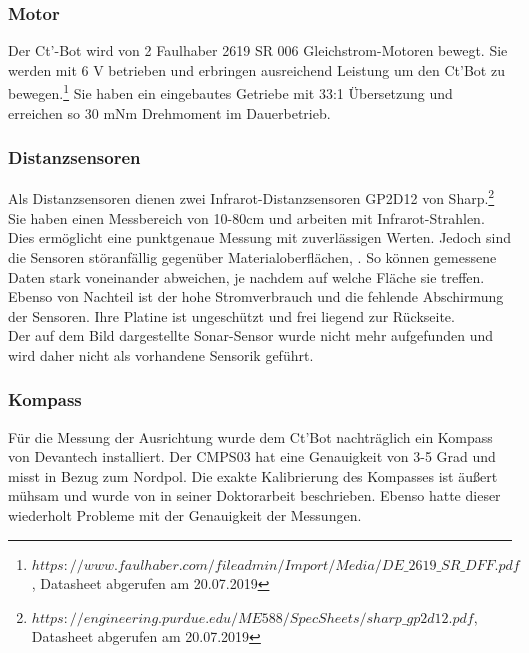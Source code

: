 \documentclass[twoside,11pt, a4paper]{report}
\begin{document}
	\subsubsection{Motor}
	Der Ct'-Bot wird von 2 Faulhaber 2619 SR 006 Gleichstrom-Motoren bewegt. Sie werden mit 6 V betrieben und erbringen ausreichend Leistung um den Ct'Bot zu bewegen.\footnote{$https://www.faulhaber.com/fileadmin/Import/Media/DE\_2619\_SR\_DFF.pdf$, Datasheet abgerufen am 20.07.2019} Sie haben ein eingebautes Getriebe mit 33:1 Übersetzung und erreichen so 30 mNm Drehmoment im Dauerbetrieb. 
	
	\subsubsection{Distanzsensoren}
	Als Distanzsensoren dienen zwei Infrarot-Distanzsensoren GP2D12 von Sharp.\footnote{$https://engineering.purdue.edu/ME588/SpecSheets/sharp\_gp2d12.pdf$, Datasheet abgerufen am 20.07.2019} Sie haben einen Messbereich von 10-80cm und arbeiten mit Infrarot-Strahlen. Dies ermöglicht eine punktgenaue Messung mit zuverlässigen Werten. Jedoch sind die Sensoren störanfällig gegenüber Materialoberflächen, \cite{HeLiNue2012}. So können gemessene Daten stark voneinander abweichen, je nachdem auf welche Fläche sie treffen. Ebenso von Nachteil ist der hohe Stromverbrauch und die fehlende Abschirmung der Sensoren. Ihre Platine ist ungeschützt und frei liegend zur Rückseite. \\
	Der auf dem Bild dargestellte Sonar-Sensor wurde nicht mehr aufgefunden und wird daher nicht als vorhandene Sensorik geführt. 
	
	\subsubsection{Kompass}
	Für die Messung der Ausrichtung wurde dem Ct'Bot nachträglich ein Kompass von Devantech installiert. Der CMPS03 hat eine Genauigkeit von 3-5 Grad und misst in Bezug zum Nordpol. Die exakte Kalibrierung des Kompasses ist äußert mühsam und wurde von \cite{Hofmeister2011} in seiner Doktorarbeit beschrieben. Ebenso hatte dieser wiederholt Probleme mit der Genauigkeit der Messungen. 
	
\end{document}
